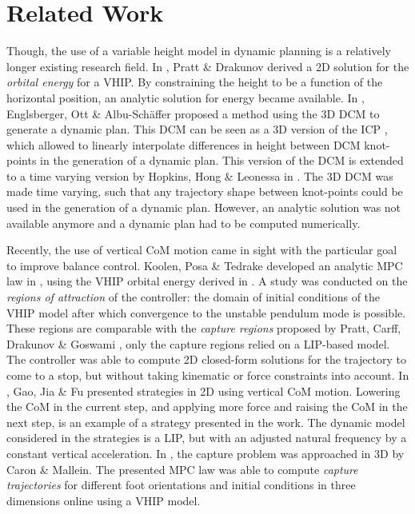 \section{Related Work}
Though, the use of a variable height model in dynamic planning is a relatively longer existing research field. In \cite{pratt2007derivation}, Pratt \& Drakunov derived a \ac{2D} solution for the \textit{orbital energy} for a \ac{VHIP}. By constraining the height to be a function of the horizontal position, an analytic solution for energy became available. In \cite{englsberger2013three}, Englsberger, Ott \& Albu-Sch{\"a}ffer proposed a method using the \ac{3D} \ac{DCM} to generate a dynamic plan. This \ac{DCM} can be seen as a \ac{3D} version of the \ac{ICP} \cite{koolen2012capturability}, which allowed to linearly interpolate differences in height between \ac{DCM} knot-points in the generation of a dynamic plan.  This version of the \ac{DCM} is extended to a time varying version by Hopkins, Hong \& Leonessa in \cite{hopkins2014humanoid}. The \ac{3D} \ac{DCM} was made time varying, such that any trajectory shape between knot-points could be used in the generation of a dynamic plan. However, an analytic solution was not available anymore and a dynamic plan had to be computed numerically. 

Recently, the use of vertical \ac{CoM} motion came in sight with the particular goal to improve balance control. Koolen, Posa \& Tedrake developed an analytic \ac{MPC} law in \cite{koolen2016balance}, using the \ac{VHIP} orbital energy derived in \cite{pratt2007derivation}. A study was conducted on the \textit{regions of attraction} of the controller: the domain of initial conditions of the \ac{VHIP} model after which convergence to the unstable pendulum mode is possible. These regions are comparable with the \textit{capture regions} proposed by Pratt, Carff, Drakunov \& Goswami \cite{pratt2006capture}, only the capture regions relied on a \ac{LIP}-based model. The controller was able to compute \ac{2D} closed-form solutions for the trajectory to come to a stop, but without taking kinematic or force constraints into account. In \cite{gao2017increase}, Gao, Jia \& Fu presented strategies in \ac{2D} using vertical \ac{CoM} motion. Lowering the \ac{CoM} in the current step, and applying more force and raising the \ac{CoM} in the next step, is an example of a strategy presented in the work. The dynamic model considered in the strategies is a \ac{LIP}, but with an adjusted natural frequency by a constant vertical acceleration. In \cite{caron2018balance}, the capture problem was approached in \ac{3D} by Caron \& Mallein. The presented \ac{MPC} law was able to compute \textit{capture trajectories} for different foot orientations and initial conditions in three dimensions online using a \ac{VHIP} model.

